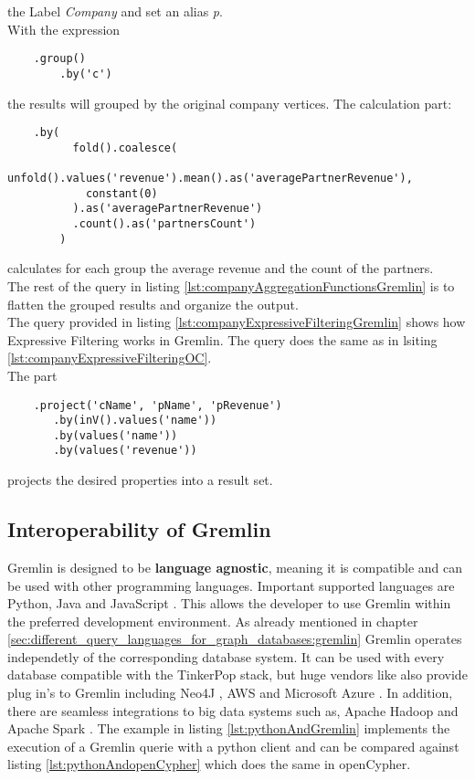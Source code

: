 the Label \textit{Company} and set an alias \textit{p}. \\ 
With the expression
\begin{lstlisting}
	.group()
	    .by('c')
\end{lstlisting}
the results will grouped by the original company vertices.
The calculation part:
\begin{lstlisting}
	.by(
	      fold().coalesce(
	        unfold().values('revenue').mean().as('averagePartnerRevenue'),
	        constant(0)
	      ).as('averagePartnerRevenue')
	      .count().as('partnersCount')
	    )
\end{lstlisting}
calculates for each group the average revenue and the count of the partners.\\
The rest of the query in listing \ref{lst:companyAggregationFunctionsGremlin} 
is to flatten the grouped results and organize the output.\\
The query provided in listing \ref{lst:companyExpressiveFilteringGremlin} 
shows how Expressive Filtering works in Gremlin.
The query does the same as in lsiting \ref{lst:companyExpressiveFilteringOC}. \\
The part
\begin{lstlisting}
	.project('cName', 'pName', 'pRevenue')
	   .by(inV().values('name'))
	   .by(values('name'))
	   .by(values('revenue'))
\end{lstlisting} 
projects the desired properties into a result set.

\subsection{Interoperability of Gremlin}
\label{subsec:different_query_languages_for_graph_databases:gremlin:interoperability}
Gremlin is designed to be \textbf{language agnostic}, meaning it is compatible and
can be used with other programming languages.
Important supported languages are Python, Java and JavaScript \citep{apache_gremlin_2024}.
This allows the developer to use Gremlin within the preferred 
development environment.
As already mentioned in chapter \ref{sec:different_query_languages_for_graph_databases:gremlin} Gremlin operates independetly of the corresponding
database system. It can be used with every database compatible with the TinkerPop stack, but huge
vendors like also provide plug in's to Gremlin including Neo4J \citep{noauthor_neo4j_223}, \ac{AWS} \citep{gremlin_chaos_nodate} 
and Microsoft Azure \citep{sharma_what_2024}.
In addition, there are seamless integrations to big data systems such as,
Apache Hadoop \citep{apache_hadoop_2024} and Apache Spark \citep{apache_spark_2024}.
The example in listing \ref{lst:pythonAndGremlin} implements 
the execution of a Gremlin querie with a python client and can be compared against
listing \ref{lst:pythonAndopenCypher} which does the same in openCypher.


